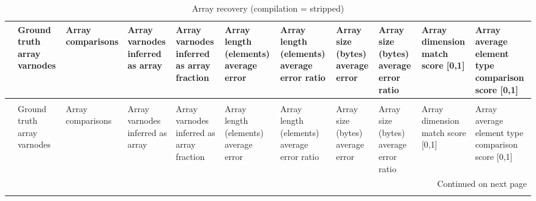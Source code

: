 \begin{longtable}{lp{1.2cm}p{1.2cm}p{1.2cm}p{1.2cm}p{1.2cm}p{1.2cm}p{1.2cm}p{1.2cm}p{1.2cm}p{1.2cm}}
\caption{Array recovery (compilation = stripped)}
\label{table:array-comparisons-O0-strip}\\
\toprule
{} &  Ground truth array varnodes &  Array comparisons &  Array varnodes inferred as array &  Array varnodes inferred as array fraction &  Array length (elements) average error &  Array length (elements) average error ratio &  Array size (bytes) average error &  Array size (bytes) average error ratio &  Array dimension match score [0,1] &  Array average element type comparison score [0,1] \\
\midrule
\endfirsthead
\caption[]{Array recovery (compilation = stripped)} \\
\toprule
{} &  Ground truth array varnodes &  Array comparisons &  Array varnodes inferred as array &  Array varnodes inferred as array fraction &  Array length (elements) average error &  Array length (elements) average error ratio &  Array size (bytes) average error &  Array size (bytes) average error ratio &  Array dimension match score [0,1] &  Array average element type comparison score [0,1] \\
\midrule
\endhead
\midrule
\multicolumn{11}{r}{{Continued on next page}} \\
\midrule
\endfoot


\end{longtable}
